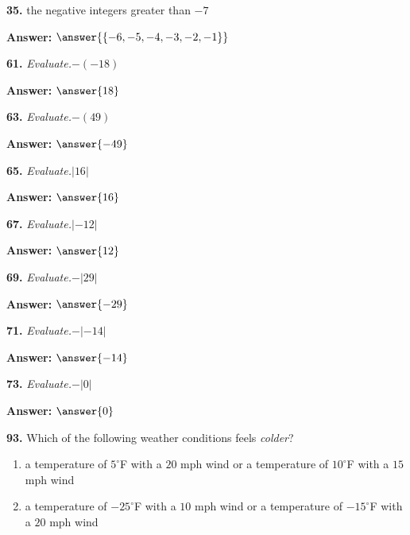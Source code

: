 \documentclass{ximera}
\begin{document}
\begin{problem}
\textbf{35.} the negative integers greater than $-7$

\textbf{Answer:} $\answer{\{-6,-5,-4,-3,-2,-1\}}$
\end{problem}

\begin{problem}
\textbf{61.} \emph{Evaluate.}\quad $-(-18)$

\textbf{Answer:} $\answer{18}$
\end{problem}

\begin{problem}
\textbf{63.} \emph{Evaluate.}\quad $-(49)$

\textbf{Answer:} $\answer{-49}$
\end{problem}

\begin{problem}
\textbf{65.} \emph{Evaluate.}\quad $|16|$

\textbf{Answer:} $\answer{16}$
\end{problem}

\begin{problem}
\textbf{67.} \emph{Evaluate.}\quad $\lvert -12 \rvert$

\textbf{Answer:} $\answer{12}$
\end{problem}

\begin{problem}
\textbf{69.} \emph{Evaluate.}\quad $-|29|$

\textbf{Answer:} $\answer{-29}$
\end{problem}

\begin{problem}
\textbf{71.} \emph{Evaluate.}\quad $-\lvert -14 \rvert$

\textbf{Answer:} $\answer{-14}$
\end{problem}

\begin{problem}
\textbf{73.} \emph{Evaluate.}\quad $-|0|$

\textbf{Answer:} $\answer{0}$
\end{problem}

\begin{problem}
\textbf{93.} Which of the following weather conditions feels \emph{colder}?
  \begin{enumerate}[label=\textbf{\alph*.},leftmargin=2em,topsep=2pt,itemsep=1pt]
    \item a temperature of $5^\circ$F with a $20$ mph wind or a temperature of
          $10^\circ$F with a $15$ mph wind
    \item a temperature of $-25^\circ$F with a $10$ mph wind or a temperature of
          $-15^\circ$F with a $20$ mph wind
  \end{enumerate}

\begin{multipleChoice}
\end{multipleChoice}
\end{problem}
\end{document}
